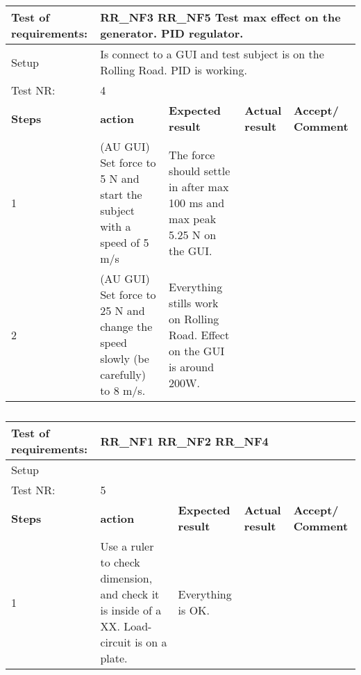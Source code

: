 \begin{table}[h!]
	\centering
	\label{my-label}	
	\begin{tabular}{|p{1.5 cm}|p{4.2 cm}|p{2.1 cm}|p{2.1 cm}|p{2.1 cm}|}
		\hline
		Test of requirements: 
		& \multicolumn{4}{l|}{RR\_NF3 RR\_NF5  Test max effect on the generator.	PID regulator.} \\ \hline
		Setup 
		& \multicolumn{4}{l|}{Is connect to a GUI and test subject is on the Rolling Road. PID is working.} \\ \hline
		Test NR:
		& \multicolumn{4}{l|}{4} \\ \hline
		\textbf{Steps} & \textbf{action} & \textbf{Expected result} & 
		\textbf{Actual result} & \textbf{Accept/ Comment} \\ \hline
		1 
		& (AU GUI) Set force to 5 N and start the subject with a speed of 5 m/s  
		& The force should settle in after max 100 ms and max peak 5.25 N on the GUI.  
		&
		& \\ \hline
		2
		& (AU GUI) Set force to 25 N and change the speed slowly (be carefully) to 8 m/s.
		& Everything stills work on Rolling Road. Effect on the GUI is around 200W.
		&
		& \\ \hline
	\end{tabular}
	\caption{}
\end{table}

\begin{table}[h!]
	\centering
	\label{my-label}	
	\begin{tabular}{|p{1.5 cm}|p{4.2 cm}|p{2.1 cm}|p{2.1 cm}|p{2.1 cm}|}
		\hline
		Test of requirements: 
		& \multicolumn{4}{l|}{RR\_NF1 RR\_NF2 RR\_NF4} \\ \hline
		Setup 
		& \multicolumn{4}{l|}{} \\ \hline
		Test NR:
		& \multicolumn{4}{l|}{5} \\ \hline
		\textbf{Steps} & \textbf{action} & \textbf{Expected result} & 
		\textbf{Actual result} & \textbf{Accept/ Comment} \\ \hline
		1 
		& Use a ruler to check dimension, and check it is inside of a XX. Load-circuit is on a plate.
		& Everything is OK.
		&
		& \\ \hline
	\end{tabular}
	\caption{}
\end{table}

